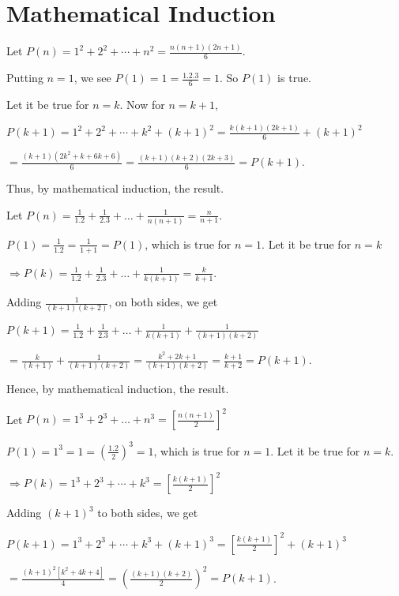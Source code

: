 \chapter{Mathematical Induction}
\startitemize[n, 1*broad]
\item Let $P(n) = 1^2 + 2^2 + \cdots + n^2 = \frac{n(n + 1)(2n + 1)}{6}$.

  Putting $n = 1$, we see $P(1) = 1 = \frac{1.2.3}{6} = 1$. So $P(1)$ is true.

  Let it be true for $n = k$. Now for $n = k + 1$,

  $P(k + 1) = 1^2 + 2^2 + \cdots + k^2 + (k + 1)^2 =  \frac{k(k + 1)(2k + 1)}{6} + (k + 1)^2$

  $= \frac{(k +
    1)(2k^2 + k + 6k + 6)}{6} = \frac{(k + 1)(k + 2)(2k + 3)}{6} = P(k + 1)$.

  Thus, by mathematical induction, the result.
\item Let $P(n) = \frac{1}{1.2} + \frac{1}{2.3} + \ldots + \frac{1}{n(n + 1)} = \frac{n}{n + 1}$.

  $P(1) = \frac{1}{1.2} = \frac{1}{1 + 1} = P(1)$, which is true for $n = 1$. Let it be true for $n = k$

  $\Rightarrow P(k) = \frac{1}{1.2} + \frac{1}{2.3} + \ldots + \frac{1}{k(k + 1)} = \frac{k}{k + 1}$.

  Adding $\frac{1}{(k + 1)(k + 2)}$, on both sides, we get

  $P(k + 1) = \frac{1}{1.2} + \frac{1}{2.3} + \ldots + \frac{1}{k(k + 1)} + \frac{1}{(k + 1)(k + 2)}$

  $= \frac{k}{(k + 1)} + \frac{1}{(k + 1)(k + 2)} = \frac{k^2 + 2k + 1}{(k + 1)(k + 2)} = \frac{k + 1}{k + 2} =
  P(k +1)$.

  Hence, by mathematical induction, the result.
\item Let $P(n) = 1^3 + 2^3 + \ldots + n^3 = \left[\frac{n(n + 1)}{2}\right]^2$

  $P(1) = 1^3 = 1 = \left(\frac{1.2}{2}\right)^3 = 1$, which is true for $n = 1$. Let it be true for $n =
  k$.

  $\Rightarrow P(k) = 1^3 + 2^3 + \cdots + k^3 = \left[\frac{k(k + 1)}{2}\right]^2$

  Adding $(k + 1)^3$ to both sides, we get

  $P(k + 1) = 1^3 + 2^3 + \cdots + k^3 + (k + 1)^3= \left[\frac{k(k + 1)}{2}\right]^2 + (k + 1)^3$

  $= \frac{(k
    + 1)^2[k^2 + 4k + 4]}{4} = \left(\frac{(k + 1)(k + 2)}{2}\right)^2 = P(k + 1)$.

